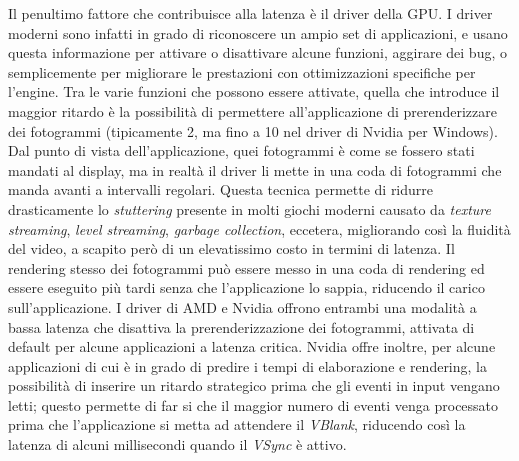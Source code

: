 Il penultimo fattore che contribuisce alla latenza è il driver della GPU. I driver moderni sono infatti in grado di riconoscere un ampio set di applicazioni, e usano questa informazione per attivare o disattivare alcune funzioni, aggirare dei bug, o semplicemente per migliorare le prestazioni con ottimizzazioni specifiche per l'engine. Tra le varie funzioni che possono essere attivate, quella che introduce il maggior ritardo è la possibilità di permettere all'applicazione di prerenderizzare dei fotogrammi (tipicamente 2, ma fino a 10 nel driver di Nvidia per Windows). Dal punto di vista dell'applicazione, quei fotogrammi è come se fossero stati mandati al display, ma in realtà il driver li mette in una coda di fotogrammi che manda avanti a intervalli regolari. Questa tecnica permette di ridurre drasticamente lo \textit{stuttering} presente in molti giochi moderni causato da \textit{texture streaming}, \textit{level streaming}, \textit{garbage collection}, eccetera, migliorando così la fluidità del video, a scapito però di un elevatissimo costo in termini di latenza. Il rendering stesso dei fotogrammi può essere messo in una coda di rendering ed essere eseguito più tardi senza che l'applicazione lo sappia, riducendo il carico sull'applicazione. I driver di AMD e Nvidia offrono entrambi una modalità a bassa latenza che disattiva la prerenderizzazione dei fotogrammi, attivata di default per alcune applicazioni a latenza critica. Nvidia offre inoltre, per alcune applicazioni di cui è in grado di predire i tempi di elaborazione e rendering, la possibilità di inserire un ritardo strategico prima che gli eventi in input vengano letti; questo permette di far si che il maggior numero di eventi venga processato prima che l'applicazione si metta ad attendere il \textit{VBlank}, riducendo così la latenza di alcuni millisecondi quando il \textit{VSync} è attivo.

